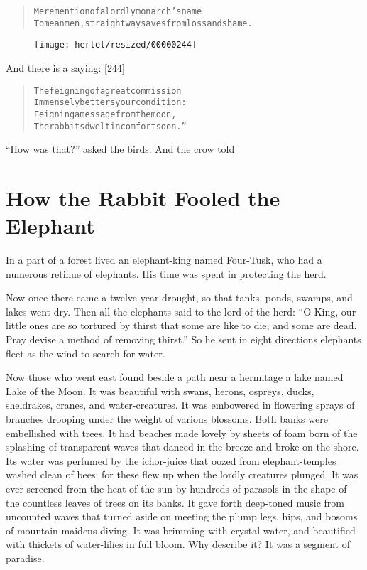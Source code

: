 \documentclass[article, twoside, 10pt]{memoir}
\renewenvironment{verbatim}{%
\begin{quote}%
\vskip -10pt%
\begin{alltt}\normalfont\small}{\end{alltt}%
\end{quote}%
\vskip -10pt
} %
\begin{document}
\begin{verbatim}
Mere mention of a lordly monarch's name
To mean men, straightway saves from loss and shame.
\end{verbatim}
\begin{figure}[p]\texttt{[image: hertel/resized/00000244]}\end{figure}And there is a saying: [244]

\begin{verbatim}
The feigning of a great commission
Immensely betters your condition:
Feigning a message from the moon,
The rabbits dwelt in comfort soon.”
\end{verbatim}
``How was that?'' asked the birds. And the crow told

\chapter{How the Rabbit Fooled the Elephant}

In a part of a forest lived an elephant-king named Four-Tusk, who
had a numerous retinue of elephants. His time was spent in
protecting the herd.

Now once there came a twelve-year drought, so that tanks, ponds,
swamps, and lakes went dry. Then all the elephants said to the lord
of the herd:
``O King, our little ones are so tortured by thirst that some are like to die, and some are dead. Pray devise a method of removing thirst.''
So he sent in eight directions elephants fleet as the wind to
search for water.

Now those who went east found beside a path near a hermitage a lake
named Lake of the Moon. It was beautiful with swans, herons,
ospreys, ducks, sheldrakes, cranes, and water-creatures. It was
embowered in flowering sprays of branches drooping under the weight
of various blossoms. Both banks were embellished with trees. It had
beaches made lovely by sheets of foam born of the splashing of
transparent waves that danced in the breeze and broke on the shore.
Its water was perfumed by the ichor-juice that oozed from
elephant-temples washed clean of bees; for these flew up when the
lordly creatures plunged. It was ever screened from the heat of the
sun by hundreds of parasols in the shape of the countless leaves of
trees on its banks. It gave forth deep-toned music from uncounted
waves that turned aside on meeting the plump legs, hips, and bosoms
of mountain maidens diving. It was brimming with crystal water, and
beautified with thickets of water-lilies in full bloom. Why
describe it? It was a segment of paradise.
\end{document}
